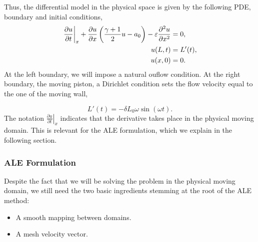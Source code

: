 \documentclass[../../thesis.tex]{subfiles}
\begin{document}


Thus, the differential model in the physical space is given by the following PDE, boundary and initial conditions,
\begin{subequations}
    \begin{align}
        \left.\frac{\partial u}{\partial t}\right|_{x} 
        + \frac{\partial u}{\partial x}\left(\frac{\gamma+1}{2}u - a_0\right) 
        - \varepsilon \pdv[2]{u}{x} &= 0, \label{eq:1d_fom_strong_pde} \\
        u(L, t) &= L'(t),
        \\
        u(x, 0) &= 0. 
    \end{align}
\end{subequations}
At the left boundary, we will impose a natural ouflow condition.
At the right boundary, the moving piston, a Dirichlet condition sets the flow velocity equal to the one of the moving wall,

\begin{equation}
    L'(t) = - \delta L_0 \omega \sin(\omega t).
\end{equation}
The notation $\left.\frac{\partial u}{\partial t}\right|_{x}$ indicates that the derivative takes place in the physical moving domain. 
This is relevant for the ALE formulation, which we explain in the following section. 

\subsubsection{ALE Formulation}
Despite the fact that we will be solving the problem in the physical moving domain, 
we still need the two basic ingredients stemming at the root of the ALE method:
\begin{itemize}
    \item A smooth mapping between domains.
    \item A mesh velocity vector.
\end{itemize}
\end{document}
